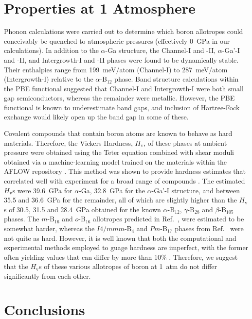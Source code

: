 \documentclass[reprint,aps,prl,twocolumn,letterpaper]{revtex4-2}
\begin{document}
\section{Properties at 1 Atmosphere}
%
Phonon calculations were carried out to determine which boron allotropes could conceivably be quenched to atmospheric pressures (effectively 0~GPa in our calculations). In addition to the $\alpha$-Ga structure, the Channel-I and -II, $\alpha$-Ga'-I and -II, and Intergrowth-I and -II phases were found to be dynamically stable. Their enthalpies range from 199~meV/atom (Channel-I) to 287~meV/atom (Intergrowth-I) relative to the $\alpha$-B$_{12}$ phase. Band structure calculations within the PBE functional suggested that Channel-I and Intergrowth-I were both small gap semiconductors, whereas the remainder were metallic. However, the PBE functional is known to underestimate band gaps, and inclusion of Hartree-Fock exchange would likely open up the band gap in some of these. 

Covalent compounds that contain boron atoms are known to behave as hard materials. Therefore, the Vickers Hardness, $H_\text{v}$, of these phases at ambient pressure were obtained using the Teter equation \cite{Teter:1998a,Chen:2011a} combined with shear moduli obtained via a machine-learning model \cite{Isayev:2017a} trained on the materials within the AFLOW repository \cite{Curtarolo:2012b,Zurek:2017o}. This method was shown to provide hardness estimates that correlated well with experiment for a broad range of compounds \cite{Zurek:2019b}. The estimated $H_\text{v}$s were 39.6~GPa for $\alpha$-Ga, 32.8~GPa for the $\alpha$-Ga'-I structure, and between 35.5 and 36.6~GPa for the remainder, all of which are slightly higher than the $H_\text{v}$s of 30.5, 31.5 and 28.4~GPa obtained for the known $\alpha$-B$_{12}$, $\gamma$-B$_{28}$ and $\beta$-B$_{105}$ phases. The $m$-B$_{16}$ and $o$-B$_{16}$ allotropes predicted in Ref.\ \cite{Fan:2014}, were estimated to be somewhat harder, whereas the $I4/mmm$-B$_4$ and $Pm$-B$_{17}$ phases from Ref.\ \cite{Zhang:2020} were not quite as hard. However, it is well known that both the computational and experimental methods employed to guage hardness are imperfect, with the former often yielding values that can differ by more than 10\% \cite{Gao:2010a}. Therefore, we suggest that the $H_\text{v}$s of these various allotropes of boron at 1~atm do not differ significantly from each other.




\section{Conclusions} 
\end{document}
